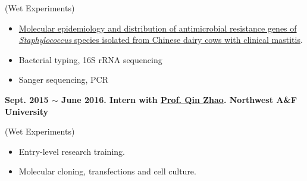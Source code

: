 (Wet Experiments)

\begin{itemize}
    \item \href{https://scholar.google.com/citations?view_op=view_citation&hl=zh-CN&user=ojSVoWQAAAAJ&citation_for_view=ojSVoWQAAAAJ:UeHWp8X0CEIC}
    {Molecular epidemiology and distribution of antimicrobial resistance genes of \textit{Staphylococcus} species isolated from Chinese dairy cows with clinical mastitis}.
    \item Bacterial typing, 16S rRNA sequencing
    \item Sanger sequencing, PCR
\end{itemize}


\textbf{
    Sept. 2015 $\sim$ June 2016. Intern with \href{https://dyxy.nwsuaf.edu.cn/en/People/FullProfessor/5e6012bf013a499c946289472b285795.htm}{Prof. Qin Zhao}. Northwest A\&F University
}

(Wet Experiments)


\begin{itemize}
    \item Entry-level research training.
    \item Molecular cloning, transfections and cell culture.
\end{itemize}